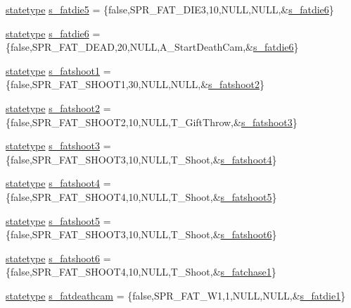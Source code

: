 \begin{DoxyCompactItemize}
\item 
\hyperlink{structstatestruct}{statetype} \hyperlink{WL__ACT2_8C_a2c89a533900581cc30bfb519c4ec5a96}{s\_\-fatdie5} = \{false,SPR\_\-FAT\_\-DIE3,10,NULL,NULL,\&\hyperlink{WL__ACT2_8C_a91a685d3fe3d1f2b146adaf869a5b5a9}{s\_\-fatdie6}\}
\item 
\hyperlink{structstatestruct}{statetype} \hyperlink{WL__ACT2_8C_a91a685d3fe3d1f2b146adaf869a5b5a9}{s\_\-fatdie6} = \{false,SPR\_\-FAT\_\-DEAD,20,NULL,A\_\-StartDeathCam,\&\hyperlink{WL__ACT2_8C_a91a685d3fe3d1f2b146adaf869a5b5a9}{s\_\-fatdie6}\}
\item 
\hyperlink{structstatestruct}{statetype} \hyperlink{WL__ACT2_8C_ab2411da54246aa51474f6350d2543f64}{s\_\-fatshoot1} = \{false,SPR\_\-FAT\_\-SHOOT1,30,NULL,NULL,\&\hyperlink{WL__ACT2_8C_a06c31e5a19db898ace76aafe6988ea15}{s\_\-fatshoot2}\}
\item 
\hyperlink{structstatestruct}{statetype} \hyperlink{WL__ACT2_8C_a06c31e5a19db898ace76aafe6988ea15}{s\_\-fatshoot2} = \{false,SPR\_\-FAT\_\-SHOOT2,10,NULL,T\_\-GiftThrow,\&\hyperlink{WL__ACT2_8C_a398b92fb8575c9200ec858c9ad239acd}{s\_\-fatshoot3}\}
\item 
\hyperlink{structstatestruct}{statetype} \hyperlink{WL__ACT2_8C_a398b92fb8575c9200ec858c9ad239acd}{s\_\-fatshoot3} = \{false,SPR\_\-FAT\_\-SHOOT3,10,NULL,T\_\-Shoot,\&\hyperlink{WL__ACT2_8C_ab59a9c3c1f25eabf66d2a28f67736bda}{s\_\-fatshoot4}\}
\item 
\hyperlink{structstatestruct}{statetype} \hyperlink{WL__ACT2_8C_ab59a9c3c1f25eabf66d2a28f67736bda}{s\_\-fatshoot4} = \{false,SPR\_\-FAT\_\-SHOOT4,10,NULL,T\_\-Shoot,\&\hyperlink{WL__ACT2_8C_a1861ef3ba422896e82356ef2a3c64322}{s\_\-fatshoot5}\}
\item 
\hyperlink{structstatestruct}{statetype} \hyperlink{WL__ACT2_8C_a1861ef3ba422896e82356ef2a3c64322}{s\_\-fatshoot5} = \{false,SPR\_\-FAT\_\-SHOOT3,10,NULL,T\_\-Shoot,\&\hyperlink{WL__ACT2_8C_a7c7310a1228963b42e6c532e05d1fabb}{s\_\-fatshoot6}\}
\item 
\hyperlink{structstatestruct}{statetype} \hyperlink{WL__ACT2_8C_a7c7310a1228963b42e6c532e05d1fabb}{s\_\-fatshoot6} = \{false,SPR\_\-FAT\_\-SHOOT4,10,NULL,T\_\-Shoot,\&\hyperlink{WL__DEF_8H_a7a5bc05a28fc2d5353459a65f27de274}{s\_\-fatchase1}\}
\item 
\hyperlink{structstatestruct}{statetype} \hyperlink{WL__ACT2_8C_ae2e05461bc31bea7fb647a6710ba6924}{s\_\-fatdeathcam} = \{false,SPR\_\-FAT\_\-W1,1,NULL,NULL,\&\hyperlink{WL__DEF_8H_a737bb7a90f84a719bdf398a39968ffed}{s\_\-fatdie1}\}
\item 

\end{DoxyCompactItemize}
